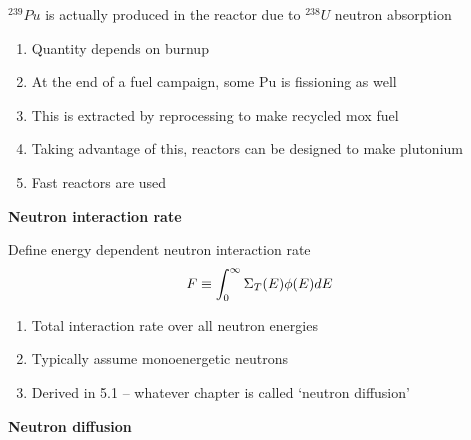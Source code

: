 \documentclass[aspectratio=1610,pdftex,dvipsnames,compress,xcolor={dvipsnames}]{beamer}
\newcommand{\acf}{\acrfull} %
\begin{document}
\begin{frame}{$^{239}Pu$ is actually produced in the reactor due to $^{238}U$ neutron absorption}
    \begin{enumerate}[series=outerlist,topsep=0pt,itemsep=21pt,leftmargin=*,label=(\arabic*)]
        \item[]Quantity depends on burnup
        \item[]At the end of a fuel campaign, some Pu is fissioning as well
        \item[]This is extracted by reprocessing to make recycled \acf{mox} fuel
        \item[]Taking advantage of this, reactors can be designed to make plutonium
        \item[]Fast reactors are used
    \end{enumerate}
\end{frame}


\begin{frame}[plain]{}
    \centering\LARGE\textbf{Neutron interaction rate}
\end{frame}


\addtocounter{framenumber}{-1} 
\begin{frame}{Define energy dependent neutron interaction rate}
    \begin{equation}
        \LARGE
        F \equiv \int^\infty_0 \Sigma_T(E) \phi(E) dE
    \end{equation}

    \vspace*{\fill}

    \begin{enumerate}[series=outerlist,topsep=0pt,itemsep=21pt,leftmargin=*,label=(\arabic*)]
        \item[]Total interaction rate over all neutron energies
        \item[]Typically assume monoenergetic neutrons
        \item[]Derived in 5.1 -- whatever chapter is called `neutron diffusion'
    \end{enumerate}
\end{frame}


\begin{frame}[plain]{}
    \centering\LARGE\textbf{Neutron diffusion}
\end{frame}
\end{document}
